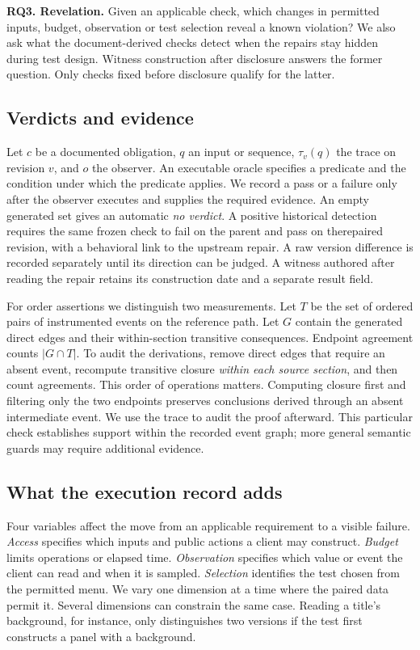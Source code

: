 \documentclass[conference]{IEEEtran}
\begin{document}
\textbf{RQ3. Revelation.} Given an applicable check, which changes in permitted inputs, budget, observation or test selection reveal a known violation? We also ask what the document-derived checks detect when the repairs stay hidden during test design. Witness construction after disclosure answers the former question. Only checks fixed before disclosure qualify for the latter.

\subsection{Verdicts and evidence}
Let $c$ be a documented obligation, $q$ an input or sequence, $\tau_v(q)$ the trace on revision $v$, and $o$ the observer. An executable oracle specifies a predicate and the condition under which the predicate applies. We record a pass or a failure only after the observer executes and supplies the required evidence. An empty generated set gives an automatic \emph{no verdict}. A positive historical detection requires the same frozen check to fail on the parent and pass on therepaired revision, with a behavioral link to the upstream repair. A raw version difference is recorded separately until its direction can be judged. A witness authored after reading the repair retains its construction date and a separate result field.

For order assertions we distinguish two measurements. Let $T$ be the set of ordered pairs of instrumented events on the reference path. Let $G$ contain the generated direct edges and their within-section transitive consequences. Endpoint agreement counts $|G\cap T|$. To audit the derivations, remove direct edges that require an absent event, recompute transitive closure \emph{within each source section}, and then count agreements. This order of operations matters. Computing closure first and filtering only the two endpoints preserves conclusions derived through an absent intermediate event. We use the trace to audit the proof afterward. This particular check establishes support within the recorded event graph; more general semantic guards may require additional evidence.

\subsection{What the execution record adds}
Four variables affect the move from an applicable requirement to a visible failure. \emph{Access} specifies which inputs and public actions a client may construct. \emph{Budget} limits operations or elapsed time. \emph{Observation} specifies which value or event the client can read and when it is sampled. \emph{Selection} identifies the test chosen from the permitted menu. We vary one dimension at a time where the paired data permit it. Several dimensions can constrain the same case. Reading a title's background, for instance, only distinguishes two versions if the test first constructs a panel with a background.
\end{document}
